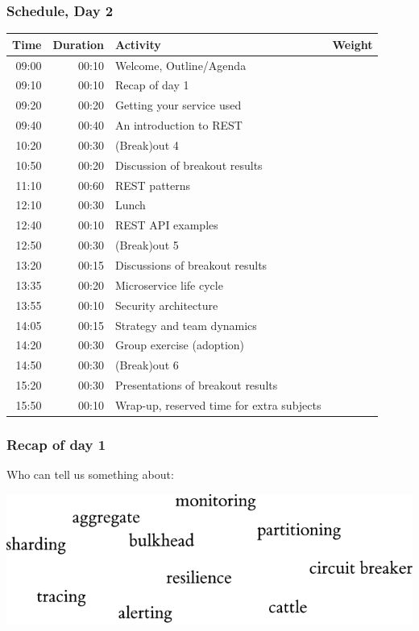 \documentclass[8pt]{article}
\begin{document}
\subsubsection{Schedule, Day 2}
\label{sec:orgc2c9b7e}
\begin{center}
\begin{tabular}{rrll}
Time & Duration & Activity & Weight\\
\hline
09:00 & 00:10 & Welcome, Outline/Agenda & \\
09:10 & 00:10 & Recap of day 1 & \\
\hline
09:20 & 00:20 & Getting your service used & \\
09:40 & 00:40 & An introduction to REST & \\
\hline
10:20 & 00:30 & (Break)out 4 & \\
\hline
10:50 & 00:20 & Discussion of breakout results & \\
11:10 & 00:60 & REST patterns & \\
12:10 & 00:30 & Lunch & \\
\hline
12:40 & 00:10 & REST API examples & \\
\hline
12:50 & 00:30 & (Break)out 5 & \\
\hline
13:20 & 00:15 & Discussions of breakout results & \\
13:35 & 00:20 & Microservice life cycle & \\
13:55 & 00:10 & Security architecture & \\
14:05 & 00:15 & Strategy and team dynamics & \\
14:20 & 00:30 & Group exercise (adoption) & \\
\hline
14:50 & 00:30 & (Break)out 6 & \\
\hline
15:20 & 00:30 & Presentations of breakout results & \\
15:50 & 00:10 & Wrap-up, reserved time for extra subjects & \\
\end{tabular}
\end{center}
\subsubsection{Recap of day 1}
\label{sec:org90dc192}

Who can tell us something about:

\begin{center}
\includegraphics[width=.9\linewidth]{graphics/svg/wordcloud-services.png}
\end{center}
\end{document}
